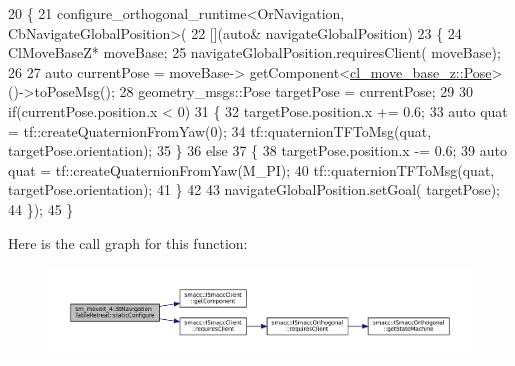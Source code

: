 \begin{DoxyCode}
20         \{
21             configure\_orthogonal\_runtime<OrNavigation, CbNavigateGlobalPosition>(
22                                                                 [](\textcolor{keyword}{auto}& navigateGlobalPosition)
23                                                                 \{
24                                                                     ClMoveBaseZ* moveBase;
25                                                                     navigateGlobalPosition.requiresClient(
      moveBase);
26 
27                                                                     \textcolor{keyword}{auto} currentPose = moveBase->
      getComponent<\hyperlink{classcl__move__base__z_1_1Pose}{cl\_move\_base\_z::Pose}>()->toPoseMsg();
28                                                                     geometry\_msgs::Pose targetPose = 
      currentPose;
29 
30                                                                     \textcolor{keywordflow}{if}(currentPose.position.x < 0)
31                                                                     \{
32                                                                         targetPose.position.x += 0.6;
33                                                                         \textcolor{keyword}{auto} quat = 
      tf::createQuaternionFromYaw(0);
34                                                                         tf::quaternionTFToMsg(quat, 
      targetPose.orientation);
35                                                                     \}
36                                                                     \textcolor{keywordflow}{else}
37                                                                     \{
38                                                                         targetPose.position.x -= 0.6;
39                                                                         \textcolor{keyword}{auto} quat = 
      tf::createQuaternionFromYaw(M\_PI);
40                                                                         tf::quaternionTFToMsg(quat, 
      targetPose.orientation);
41                                                                     \}
42 
43                                                                     navigateGlobalPosition.setGoal(
      targetPose);
44                                                                 \});
45         \}
\end{DoxyCode}
Here is the call graph for this function\+:
\nopagebreak
\begin{figure}[H]
\begin{center}
\leavevmode
\includegraphics[width=350pt]{structsm__moveit__4_1_1StNavigationTableRetreat_a499aca1e3a8cf140072466558bf99cf8_cgraph}
\end{center}
\end{figure}


